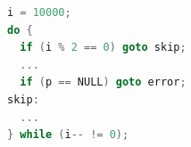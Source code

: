 \documentclass[tikz]{standalone}
\begin{document}
\begin{lrbox}{\codeBox}
\begin{lstlisting}[language=C,style=smaller]
i = 10000;
do {
  if (i % 2 == 0) goto skip;
  ...
  if (p == NULL) goto error;
skip:
  ...
} while (i-- != 0);
\end{lstlisting}
\end{lrbox}



\end{document}
